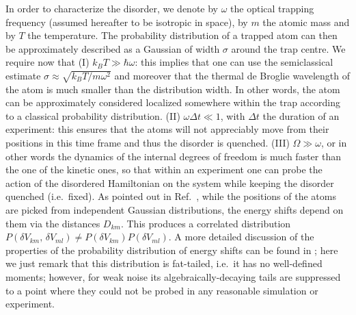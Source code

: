 \documentclass[prl,aps,twocolumn,showpacs,superscriptaddress,longbibliography]{revtex4-1}
\begin{document}
In order to characterize the disorder, we denote by $\omega$ the optical trapping frequency (assumed hereafter to be isotropic in space), by $m$ the atomic mass and by $T$ the temperature. The probability distribution of a trapped atom can then be approximately described as a Gaussian of width $\sigma$ around the trap centre. We require now that (I) $k_B T \gg \hbar \omega$: this implies that one can use the semiclassical estimate $\sigma \approx \sqrt{k_B T / m\omega^2}$ and moreover that the thermal de Broglie wavelength of the atom is much smaller than the distribution width. In other words, the atom can be approximately considered localized somewhere within the trap according to a classical probability distribution. (II) $\omega \Delta t \ll 1$, with $\Delta t$ the duration of an experiment: this ensures that the atoms will not appreciably move from their positions in this time frame and thus the disorder is quenched. (III) $\Omega \gg \omega$, or in other words the dynamics of the internal degrees of freedom is much faster than the one of the kinetic ones, so that within an experiment one can probe the action of the disordered Hamiltonian on the system while keeping the disorder quenched (i.e.~fixed). As pointed out in Ref.~\cite{a_Marcuzzi_PRL_17}, while the positions of the atoms are picked from independent Gaussian distributions, the energy shifts depend on them via the distances $D_{km}$. This produces a correlated distribution $P(\delta V_{km} ,\, \delta V_{m l}) \neq P(\delta V_{km}) P(\delta V_{ml})$. 
A more detailed discussion of the properties of the probability distribution of energy shifts can be found in \cite{SM}; here we just remark that this distribution is fat-tailed, i.e.~it has no well-defined moments; however, for weak noise its algebraically-decaying tails are suppressed to a point where they could not be probed in any reasonable simulation or experiment.
\end{document}
